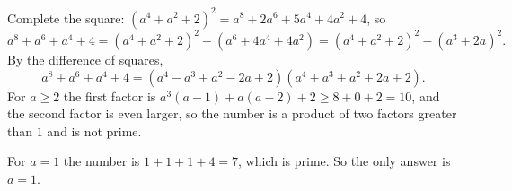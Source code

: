Complete the square: $(a^4+a^2+2)^2=a^8+2a^6+5a^4+4a^2+4$, so
\[
a^8+a^6+a^4+4=(a^4+a^2+2)^2-\left(a^6+4a^4+4a^2\right)=(a^4+a^2+2)^2-(a^3+2a)^2 .
\]
By the difference of squares,
\[
a^8+a^6+a^4+4=\left(a^4-a^3+a^2-2a+2\right)\left(a^4+a^3+a^2+2a+2\right).
\]
For $a\ge2$ the first factor is $a^3(a-1)+a(a-2)+2\ge8+0+2=10$, and the second factor is even larger, so the number is a product of two factors greater than $1$ and is not prime.

For $a=1$ the number is $1+1+1+4=7$, which is prime. So the only answer is $a=\boxed{1}$.

